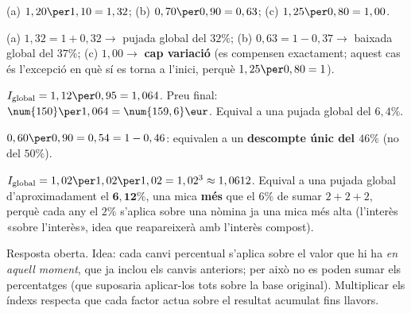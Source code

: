 \begin{solucions}
\begin{sollist}
  \item (a) $1,20\per 1,10=1,32$; \quad (b) $0,70\per 0,90=0,63$; \quad
        (c) $1,25\per 0,80=1,00$.
  \item (a) $1,32=1+0,32\rightarrow$ pujada global del $32\%$; \quad
        (b) $0,63=1-0,37\rightarrow$ baixada global del $37\%$; \quad
        (c) $1,00\rightarrow$ \textbf{cap variació} (es compensen exactament; aquest
        cas és l'excepció en què sí es torna a l'inici, perquè $1,25\per 0,80=1$).
  \item $I_{\text{global}}=1,12\per 0,95=1,064$. Preu final:
        $\num{150}\per 1,064=\num{159,6}\eur$. Equival a una pujada global del $6,4\%$.
  \item $0,60\per 0,90=0,54=1-0,46$: equivalen a un \textbf{descompte únic del $46\%$}
        (no del $50\%$).
  \item $I_{\text{global}}=1,02\per 1,02\per 1,02=1,02^3\approx 1,0612$. Equival a una
        pujada global d'aproximadament el $\mathbf{6,12\%}$, una mica \textbf{més} que
        el $6\%$ de sumar $2+2+2$, perquè cada any el $2\%$ s'aplica sobre una nòmina ja
        una mica més alta (l'interès «sobre l'interès», idea que reapareixerà amb
        l'interès compost).
  \item Resposta oberta. Idea: cada canvi percentual s'aplica sobre el valor que hi ha
        \emph{en aquell moment}, que ja inclou els canvis anteriors; per això no es
        poden sumar els percentatges (que suposaria aplicar-los tots sobre la base
        original). Multiplicar els índexs respecta que cada factor actua sobre el
        resultat acumulat fins llavors.
\end{sollist}
\end{solucions}
